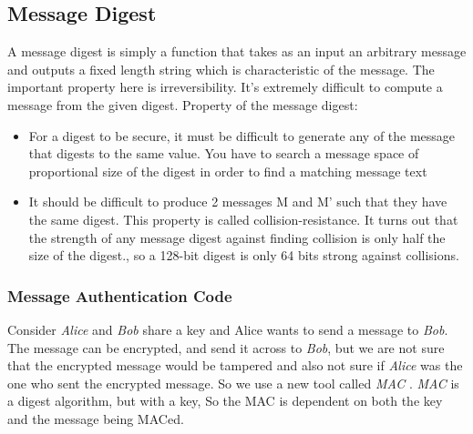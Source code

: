 \documentclass[a4paper]{article}
\begin{document}
\subsection{Message Digest}
A message digest is simply a function that takes as an input an arbitrary message and outputs a fixed length string 
which is characteristic of the message. The important property here is irreversibility.  
It's extremely difficult to compute a message from the given digest. 
Property of the message digest: 
\begin{itemize}
    \item For a digest to be secure, it must be difficult to generate any of the message that digests to the same value. 
        You have to search a message space of proportional size of the digest in order to find a matching message text
    \item It should be difficult to produce 2 messages M and M' such that they have the same digest. 
        This property is called collision-resistance. It turns out that the strength of any message digest 
        against finding collision is only half the size of the digest., so a 128-bit digest is only 64 bits strong against collisions.
\end{itemize}
\subsubsection{Message Authentication Code}
Consider \textit{Alice} and \textit{Bob} share a key and Alice wants to send a message to \textit{Bob}. The message can be encrypted, 
and send it across to \textit{Bob}, but we are not sure that the encrypted message would be tampered and also not sure 
if \textit{Alice} was the one who sent the encrypted message.  So we use a new tool called \textit{MAC} . \textit{MAC} is a digest algorithm,
but with a key, So the MAC is dependent on both the key and the message being MACed.
\end{document}
